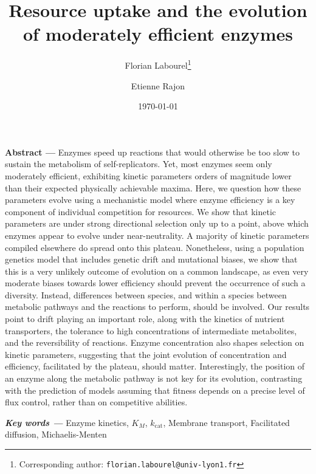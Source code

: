 \documentclass[11pt,onecolumn]{article}
\providecommand{\keywords}[1]{\textbf{\textit{Key words --- }} #1}
\renewcommand{\abstract}[1]{\textbf{Abstract --- } #1}
\begin{document}
\title{Resource uptake and the evolution of moderately efficient enzymes}
\date{\today}
\author[,1]{Florian Labourel\thanks{Corresponding author: \texttt{florian.labourel@univ-lyon1.fr}}}
\author[1]{Etienne Rajon}

 

  \maketitle
  
    \abstract{Enzymes speed up reactions that would otherwise be too slow to sustain the metabolism of self-replicators. Yet, most enzymes seem only moderately efficient, exhibiting kinetic parameters orders of magnitude lower than their expected physically achievable maxima. Here, we question how these parameters evolve using a mechanistic model where enzyme efficiency is a key component of individual competition for resources. We show that kinetic parameters are under strong directional selection only up to a point, above which enzymes appear to evolve under near-neutrality. A majority of kinetic parameters compiled elsewhere do spread onto this plateau. Nonetheless, using a population genetics model that includes genetic drift and mutational biases, we show that this is a very unlikely outcome of evolution on a common landscape, as even very moderate biases towards lower efficiency should prevent the occurrence of such a diversity. Instead, differences between species, and within a species between metabolic pathways and the reactions to perform, should be involved. Our results point to drift playing an important role, along with the kinetics of nutrient transporters, the tolerance to high concentrations of intermediate metabolites, and the reversibility of reactions. Enzyme concentration also shapes selection on kinetic parameters, suggesting that the joint evolution of concentration and efficiency, facilitated by the plateau, should matter. Interestingly, the position of an enzyme along the metabolic pathway is not key for its evolution, contrasting with the prediction of models assuming that fitness depends on a precise level of flux control, rather than on competitive abilities.}

\keywords{Enzyme kinetics, $K_M$, $k_\text{cat}$, Membrane transport, Facilitated diffusion, Michaelis-Menten}
\vspace{0.5cm}
\end{document}
